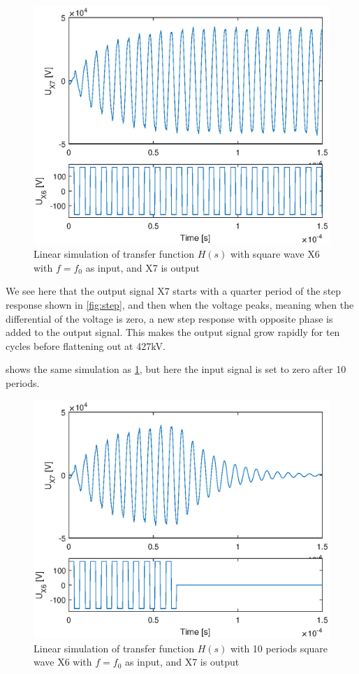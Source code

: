 \begin{figure}[H]
    \centering
    \includegraphics[width=\textwidth]{img/CoilRigSimulation.eps}
    \caption{Linear simulation of transfer function $H(s)$ with square wave X6 with $f=f_0$ as input, and X7 is output}
    \label{fig:crlinsim}
\end{figure}

We see here that the output signal X7 starts with a quarter period of the step response shown in \cref{fig:step}, and then when the voltage peaks, meaning when the differential of the voltage is zero, a new step response with opposite phase is added to the output signal. This makes the output signal grow rapidly for ten cycles before flattening out at 427kV.

 shows the same simulation as \cref{fig:crlinsim}, but here the input signal is set to zero after 10 periods.

\begin{figure}[H]
    \centering
    \includegraphics[width=\textwidth]{img/Linsim_10T.eps}
    \caption{Linear simulation of transfer function $H(s)$ with 10 periods square wave X6 with $f=f_0$ as input, and X7 is output}
    \label{fig:crlinsim10T}
\end{figure}

